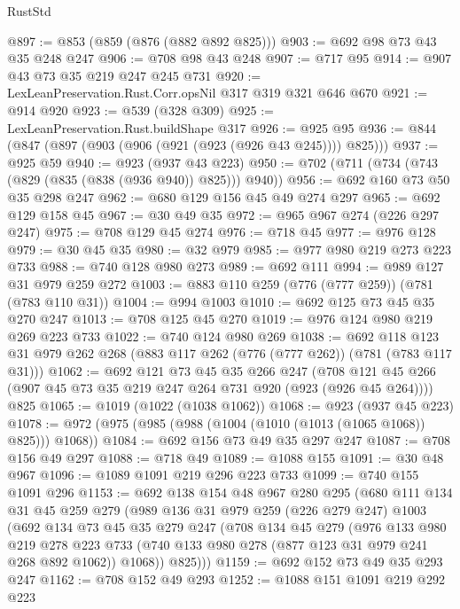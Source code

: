 \begin{lexlean}{RustStd}
\begin{coremodule}
@897 := @853 (@859 (@876 (@882 @892 @825)))
@903 := @692 @98 @73 @43 @35 @248 @247
@906 := @708 @98 @43 @248
@907 := @717 @95
@914 := @907 @43 @73 @35 @219 @247 @245 @731
@920 := LexLeanPreservation.Rust.Corr.opsNil @317 @319 @321 @646 @670
@921 := @914 @920
@923 := @539 (@328 @309)
@925 := LexLeanPreservation.Rust.buildShape @317
@926 := @925 @95
@936 := @844 (@847 (@897 (@903 (@906 (@921 (@923 (@926 @43 @245)))) @825)))
@937 := @925 @59
@940 := @923 (@937 @43 @223)
@950 := @702 (@711 (@734 (@743 (@829 (@835 (@838 (@936 @940)) @825))) @940))
@956 := @692 @160 @73 @50 @35 @298 @247
@962 := @680 @129 @156 @45 @49 @274 @297
@965 := @692 @129 @158 @45
@967 := @30 @49 @35
@972 := @965 @967 @274 (@226 @297 @247)
@975 := @708 @129 @45 @274
@976 := @718 @45
@977 := @976 @128
@979 := @30 @45 @35
@980 := @32 @979
@985 := @977 @980 @219 @273 @223 @733
@988 := @740 @128 @980 @273
@989 := @692 @111
@994 := @989 @127 @31 @979 @259 @272
@1003 := @883 @110 @259 (@776 (@777 @259)) (@781 (@783 @110 @31))
@1004 := @994 @1003
@1010 := @692 @125 @73 @45 @35 @270 @247
@1013 := @708 @125 @45 @270
@1019 := @976 @124 @980 @219 @269 @223 @733
@1022 := @740 @124 @980 @269
@1038 := @692
    @118
    @123
    @31
    @979
    @262
    @268
    (@883 @117 @262 (@776 (@777 @262)) (@781 (@783 @117 @31)))
@1062 := @692
    @121
    @73
    @45
    @35
    @266
    @247
    (@708 @121 @45 @266 (@907 @45 @73 @35 @219 @247 @264 @731 @920 (@923 (@926 @45 @264))))
    @825
@1065 := @1019 (@1022 (@1038 @1062))
@1068 := @923 (@937 @45 @223)
@1078 := @972 (@975 (@985 (@988 (@1004 (@1010 (@1013 (@1065 @1068)) @825))) @1068))
@1084 := @692 @156 @73 @49 @35 @297 @247
@1087 := @708 @156 @49 @297
@1088 := @718 @49
@1089 := @1088 @155
@1091 := @30 @48 @967
@1096 := @1089 @1091 @219 @296 @223 @733
@1099 := @740 @155 @1091 @296
@1153 := @692
    @138
    @154
    @48
    @967
    @280
    @295
    (@680
      @111
      @134
      @31
      @45
      @259
      @279
      (@989
        @136
        @31
        @979
        @259
        (@226 @279 @247)
        @1003
        (@692
          @134
          @73
          @45
          @35
          @279
          @247
          (@708
            @134
            @45
            @279
            (@976
              @133
              @980
              @219
              @278
              @223
              @733
              (@740 @133 @980 @278 (@877 @123 @31 @979 @241 @268 @892 @1062))
              @1068))
          @825)))
@1159 := @692 @152 @73 @49 @35 @293 @247
@1162 := @708 @152 @49 @293
@1252 := @1088
    @151
    @1091
    @219
    @292
    @223

\end{coremodule}
\end{lexlean}
